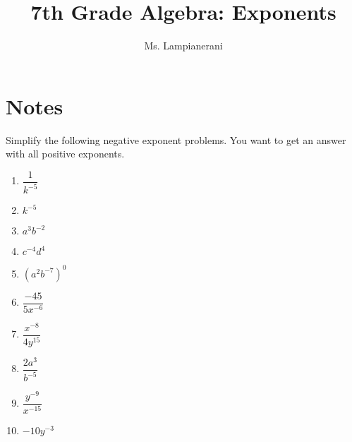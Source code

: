 \documentclass{article}
\begin{document}
\title{7th Grade Algebra: Exponents}
\author{Ms. Lampianerani}
\maketitle
\section{Notes}
 Simplify the following negative exponent problems. You want to get an answer with   all positive exponents.

\begin{multicols}{2}
\begin{enumerate}
\item $\dfrac{1}{k^{-5}}$
\item $k^{-5}$
\item $a^3 b^{-2}$
\item $c^{-4}d^{4}$
\item $(a^2 b^{-7})^{0}$
\item $\dfrac{-45}{5x^{-6}}$
\item $\dfrac{x^{-8}}{4y^{15}}$
\item $\dfrac{2a^3}{b^{-5}}$
\item $\dfrac{y^{-9}}{x^{-15}}$
\item $ - 10y^{-3}$
\end{enumerate}
\end{multicols}
\end{document}

